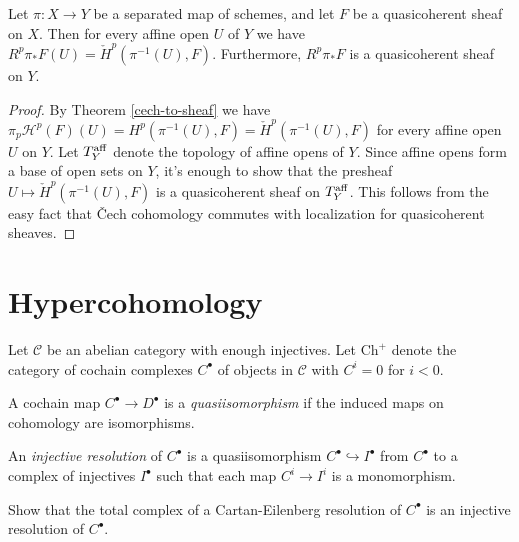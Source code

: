 \begin{thm} Let $\pi:X\rightarrow Y$ be a separated map of schemes, and let $F$ be a quasicoherent sheaf on $X$. Then for every affine open $U$ of $Y$ we have $R^p\pi_*F(U) = \check{H}^p(\pi^{-1}(U),F)$. Furthermore, $R^p\pi_*F$ is a quasicoherent sheaf on $Y$.
\end{thm}
\begin{proof} By Theorem \ref{cech-to-sheaf} we have $\pi_p\mathcal{H}^p(F)(U) = H^p(\pi^{-1}(U),F) = \check{H}^p(\pi^{-1}(U),F)$ for every affine open $U$ on $Y$. Let $T_Y^{\rm aff}$ denote the topology of affine opens of $Y$. Since affine opens form a base of open sets on $Y$, it's enough to show that the presheaf $U\mapsto \check{H}^p(\pi^{-1}(U),F)$ is a quasicoherent sheaf on $T_Y^{\rm aff}$. This follows from the easy fact that \v{C}ech cohomology commutes with localization for quasicoherent sheaves.
\end{proof}

\section{Hypercohomology}

Let $\mathcal{C}$ be an abelian category with enough injectives. Let $\mbox{Ch}^+$ denote the category of cochain complexes $C^\bullet$ of objects in $\mathcal{C}$ with $C^i = 0$ for $i < 0$.

\begin{defn} A cochain map $C^\bullet \rightarrow D^\bullet$ is a \emph{quasiisomorphism} if the induced maps on cohomology are isomorphisms.
\end{defn}

\begin{defn} An \emph{injective resolution} of $C^\bullet$ is a quasiisomorphism $C^\bullet \hookrightarrow I^\bullet$ from $C^\bullet$ to a complex of injectives $I^\bullet$ such that each map $C^i \rightarrow I^i$ is a monomorphism.
\end{defn}

\begin{exer} Show that the total complex of a Cartan-Eilenberg resolution of $C^\bullet$ is an injective resolution of $C^\bullet$.
\end{exer}

